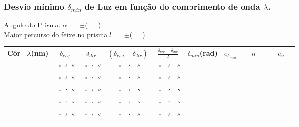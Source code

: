 \documentclass[a4paper,12pt]{article}  %
\begin{document}
\subsubsection{Desvio mínimo $\delta_{min}$ de Luz em função do comprimento de onda $\lambda$.
}\label{subsec:minimo}

\noindent Angulo do Prisma:  $\alpha=$~\underline{\makebox[1.5cm][r]{~}}$\pm$\underline{\makebox[1cm][r]{~}}(~~~)\\
Maior percurso do feixe no prisma  $l=$~\underline{\makebox[1.5cm][r]{~}}$\pm$\underline{\makebox[1cm][r]{~}}(~~~)
\begin{center}
 	\begin{tabular}{|l|l|c|c|c|c|r|r|c|c|}
 	\hline
	Côr &  $\lambda$(nm)   & $\delta_{esq}$ & $\delta_{dir}$& $(\delta_{esq} - \delta_{dir})$ & $\frac{\delta_{esq} - \delta_{dir}}{2}$ & $\delta_{min}$(rad)& $e_{\delta_{min}}$ & $n$  & $e_n$ \quad \\	\hline
	   &    &  $\;\;^{\circ}\;\;'\;\;''$ & $\;\;^{\circ}\;\;'\;\;''$ & $\;\;^{\circ}\quad'\quad''$ & $\;\;^{\circ}\quad'\quad''$ & & &  $\quad\quad\quad$ &  $\quad\quad\quad$ \\	\hline
	   &    &  $\;\;^{\circ}\;\;'\;\;''$ & $\;\;^{\circ}\;\;'\;\;''$ & $\;\;^{\circ}\quad'\quad''$ & $\;\;^{\circ}\quad'\quad''$ & & &  $\quad\quad\quad$ &  $\quad\quad\quad$ \\	\hline
	   &    &  $\;\;^{\circ}\;\;'\;\;''$ & $\;\;^{\circ}\;\;'\;\;''$ & $\;\;^{\circ}\quad'\quad''$ & $\;\;^{\circ}\quad'\quad''$ & & &  $\quad\quad\quad$ &  $\quad\quad\quad$ \\	\hline
	   &    &  $\;\;^{\circ}\;\;'\;\;''$ & $\;\;^{\circ}\;\;'\;\;''$ & $\;\;^{\circ}\quad'\quad''$ & $\;\;^{\circ}\quad'\quad''$ & & &  $\quad\quad\quad$ &  $\quad\quad\quad$ \\	\hline
	   &    &  $\;\;^{\circ}\;\;'\;\;''$ & $\;\;^{\circ}\;\;'\;\;''$ & $\;\;^{\circ}\quad'\quad''$ & $\;\;^{\circ}\quad'\quad''$ & & &  $\quad\quad\quad$ &  $\quad\quad\quad$ \\	\hline
	\end{tabular}
\end{center}
\end{document}
